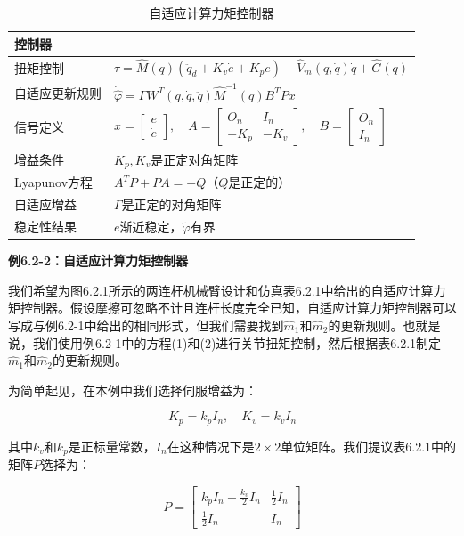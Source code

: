 \documentclass[12pt,a4paper]{ctexart}
\begin{document}
\begin{table}[H]
\centering
\caption{自适应计算力矩控制器}
\begin{tabular}{|l|l|}
\hline
\textbf{控制器} & \\ \hline
扭矩控制 & $\tau = \hat{M}(q)(\ddot{q}_d + K_v \dot{e} + K_p e) + \hat{V}_m(q, \dot{q})\dot{q} + \hat{G}(q)$ \\ \hline
自适应更新规则 & $\dot{\hat{\varphi}} = \Gamma W^T(q, \dot{q}, \ddot{q}) \hat{M}^{-1}(q) B^T P x$ \\ \hline
信号定义 & $x = \begin{bmatrix} e \\ \dot{e} \end{bmatrix}, \quad A = \begin{bmatrix} O_n & I_n \\ -K_p & -K_v \end{bmatrix}, \quad B = \begin{bmatrix} O_n \\ I_n \end{bmatrix}$ \\ \hline
增益条件 & $K_p, K_v$是正定对角矩阵 \\ \hline
Lyapunov方程 & $A^T P + PA = -Q$（$Q$是正定的） \\ \hline
自适应增益 & $\Gamma$是正定的对角矩阵 \\ \hline
稳定性结果 & $e$渐近稳定，$\tilde{\varphi}$有界 \\ \hline
\end{tabular}
\end{table}

\textbf{例6.2-2：自适应计算力矩控制器}

我们希望为图6.2.1所示的两连杆机械臂设计和仿真表6.2.1中给出的自适应计算力矩控制器。假设摩擦可忽略不计且连杆长度完全已知，自适应计算力矩控制器可以写成与例6.2-1中给出的相同形式，但我们需要找到$\hat{m}_1$和$\hat{m}_2$的更新规则。也就是说，我们使用例6.2-1中的方程(1)和(2)进行关节扭矩控制，然后根据表6.2.1制定$\hat{m}_1$和$\hat{m}_2$的更新规则。

为简单起见，在本例中我们选择伺服增益为：

\begin{equation}
K_p = k_p I_n, \quad K_v = k_v I_n
\end{equation}

其中$k_v$和$k_p$是正标量常数，$I_n$在这种情况下是$2 \times 2$单位矩阵。我们提议表6.2.1中的矩阵$P$选择为：

\begin{equation}
P = \begin{bmatrix} k_p I_n + \frac{k_v}{2} I_n & \frac{1}{2} I_n \\ \frac{1}{2} I_n & I_n \end{bmatrix}
\end{equation}
\end{document}
